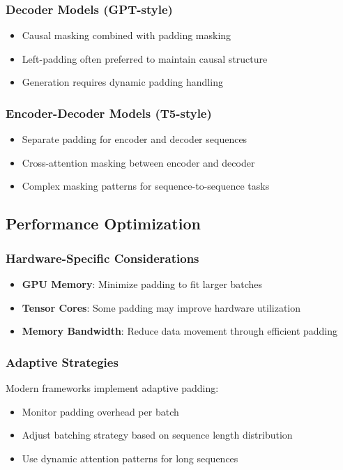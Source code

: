 \subsubsection{Decoder Models (GPT-style)}
\begin{itemize}
\item Causal masking combined with padding masking
\item Left-padding often preferred to maintain causal structure
\item Generation requires dynamic padding handling
\end{itemize}

\subsubsection{Encoder-Decoder Models (T5-style)}
\begin{itemize}
\item Separate padding for encoder and decoder sequences
\item Cross-attention masking between encoder and decoder
\item Complex masking patterns for sequence-to-sequence tasks
\end{itemize}

\subsection{Performance Optimization}

\subsubsection{Hardware-Specific Considerations}
\begin{itemize}
\item \textbf{GPU Memory}: Minimize padding to fit larger batches
\item \textbf{Tensor Cores}: Some padding may improve hardware utilization
\item \textbf{Memory Bandwidth}: Reduce data movement through efficient padding
\end{itemize}

\subsubsection{Adaptive Strategies}
Modern frameworks implement adaptive padding:
\begin{itemize}
\item Monitor padding overhead per batch
\item Adjust batching strategy based on sequence length distribution
\item Use dynamic attention patterns for long sequences
\end{itemize}

